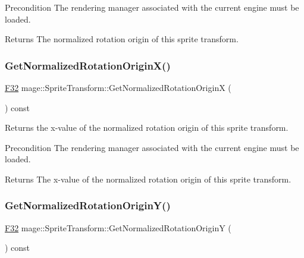 \begin{DoxyPrecond}{Precondition}
The rendering manager associated with the current engine must be loaded. 
\end{DoxyPrecond}
\begin{DoxyReturn}{Returns}
The normalized rotation origin of this sprite transform. 
\end{DoxyReturn}
\hypertarget{classmage_1_1_sprite_transform_a44a0577d7c136650027da9f5b8a6be77}{}\label{classmage_1_1_sprite_transform_a44a0577d7c136650027da9f5b8a6be77} 
\subsubsection{\texorpdfstring{Get\+Normalized\+Rotation\+Origin\+X()}{GetNormalizedRotationOriginX()}}
{\footnotesize\ttfamily \hyperlink{namespacemage_aa97e833b45f06d60a0a9c4fc22ae02c0}{F32} mage\+::\+Sprite\+Transform\+::\+Get\+Normalized\+Rotation\+OriginX (\begin{DoxyParamCaption}{ }\end{DoxyParamCaption}) const}

Returns the x-\/value of the normalized rotation origin of this sprite transform.

\begin{DoxyPrecond}{Precondition}
The rendering manager associated with the current engine must be loaded. 
\end{DoxyPrecond}
\begin{DoxyReturn}{Returns}
The x-\/value of the normalized rotation origin of this sprite transform. 
\end{DoxyReturn}
\hypertarget{classmage_1_1_sprite_transform_afc002a5d0357c2dc638cc166904446d1}{}\label{classmage_1_1_sprite_transform_afc002a5d0357c2dc638cc166904446d1} 
\subsubsection{\texorpdfstring{Get\+Normalized\+Rotation\+Origin\+Y()}{GetNormalizedRotationOriginY()}}
{\footnotesize\ttfamily \hyperlink{namespacemage_aa97e833b45f06d60a0a9c4fc22ae02c0}{F32} mage\+::\+Sprite\+Transform\+::\+Get\+Normalized\+Rotation\+OriginY (\begin{DoxyParamCaption}{ }\end{DoxyParamCaption}) const}

